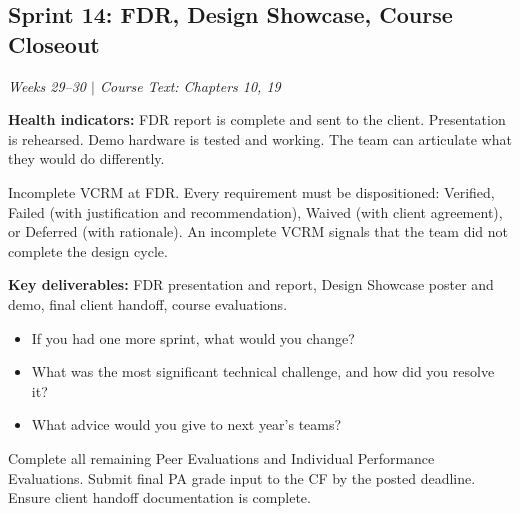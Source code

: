 
\subsection{Sprint 14: FDR, Design Showcase, Course Closeout}
\textit{Weeks 29--30 $|$ Course Text: Chapters 10, 19}

\textbf{Health indicators:} FDR report is complete and sent to the client. Presentation is rehearsed. Demo hardware is tested and working. The team can articulate what they would do differently.

\begin{redflag}
Incomplete VCRM at FDR. Every requirement must be dispositioned: Verified, Failed (with justification and recommendation), Waived (with client agreement), or Deferred (with rationale). An incomplete VCRM signals that the team did not complete the design cycle.
\end{redflag}

\textbf{Key deliverables:} FDR presentation and report, Design Showcase poster and demo, final client handoff, course evaluations.

\begin{paquestion}
\begin{itemize}[nosep,leftmargin=1.5em]
\item If you had one more sprint, what would you change?
\item What was the most significant technical challenge, and how did you resolve it?
\item What advice would you give to next year's teams?
\end{itemize}
\end{paquestion}

\begin{paaction}
Complete all remaining Peer Evaluations and Individual Performance Evaluations. Submit final PA grade input to the CF by the posted deadline. Ensure client handoff documentation is complete.
\end{paaction}


